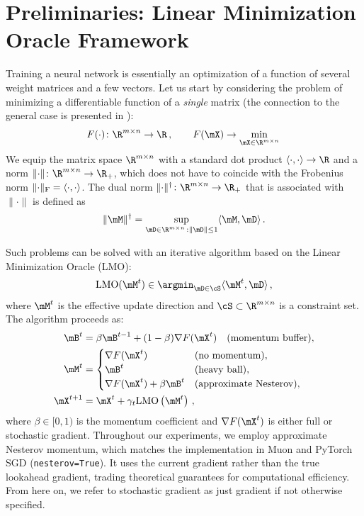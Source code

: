 \documentclass[pmlr]{jmlr}%
\newcommand{\norm}[1]{\lVert #1\rVert}
\DeclarePairedDelimiter{\normf}{\|}{\|_\mathrm{F}}
\def\<#1,#2>{\langle #1,#2\rangle}
\newcommand{\Rmn}{\R^{m\times n}}
\begin{document}
 \section{Preliminaries: Linear Minimization Oracle Framework}
 
 Training a neural network is essentially an optimization of a function of several weight matrices and a few vectors. Let us start by considering the problem of minimizing a differentiable function of a \emph{single} matrix (the connection to the general case is presented in ):
 \begin{equation}\label{eq:matrix_problem}
   F(\cdot)\colon \Rmn \to \R\,,\qquad F(\mX) \to \min_{\mX \in \Rmn}\,
 \end{equation}
 We equip the matrix space $\Rmn$ with a standard dot product $\<\cdot, \cdot> \to \R$ and a norm $\norm{\cdot}\colon \Rmn \to \R_+$, which does not have to coincide with the Frobenius norm $\normf{\cdot} = \<\cdot,\cdot>$. The dual norm $\norm{\cdot}^\dagger\colon \Rmn \to \R_+$ that is associated with $\norm{\cdot}$ is defined as
 \begin{equation}\label{eq:dual_norm}
   \norm{\mM}^\dagger = \sup_{\mD \in \Rmn\,:\norm{\mD}\leq 1} \<\mM,\mD>\,.
 \end{equation}
 
 Such problems can be solved with an iterative algorithm based on the Linear Minimization Oracle (LMO):
 \begin{equation}\label{eq:lmo}
   \mathrm{LMO}(\mM^t) \in \argmin_{\mD \in \cS} \langle\mM^t, \mD\rangle\,,
 \end{equation}
 where $\mM^t$ is the effective update direction and $\cS \subset \Rmn$ is a constraint set. The algorithm proceeds as:
 \begin{equation}\label{eq:simple_update}
   \begin{aligned}
   \mB^t &= \beta \mB^{t-1} + (1 - \beta) \nabla F(\mX^t) \quad \text{(momentum buffer)},\\
   \mM^t &= \begin{cases}
   \nabla F(\mX^t) & \text{(no momentum)},\\
   \mB^t & \text{(heavy ball)},\\
   \nabla F(\mX^t) + \beta \mB^t & \text{(approximate Nesterov)},
   \end{cases}\\
   \mX^{t + 1} &= \mX^t + \gamma_t\mathrm{LMO}\left(\mM^t\right)\,,
   \end{aligned}
 \end{equation}
 where $\beta \in [0, 1)$ is the momentum coefficient and $\nabla F(\mX^t)$ is either full or stochastic gradient. Throughout our experiments, we employ approximate Nesterov momentum, which matches the implementation in Muon and PyTorch SGD (\texttt{nesterov=True}). It uses the current gradient rather than the true lookahead gradient, trading theoretical guarantees for computational efficiency. From here on, we refer to stochastic gradient as just gradient if not otherwise specified.
 
\end{document}
